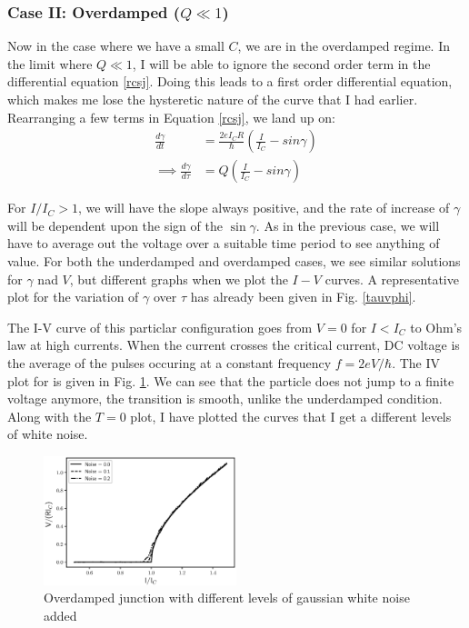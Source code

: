 \documentclass{thesis}
\begin{document}
\subsubsection{Case II: Overdamped ($Q\ll 1$)}

Now in the case where we have a small $C$, we are in the overdamped regime. In the limit where $Q \ll 1$, I will be able to ignore the second order term in the differential equation \ref{rcsj}. Doing this leads to a first order differential equation, which makes me lose the hysteretic nature of the curve that I had earlier. Rearranging a few terms in Equation \ref{rcsj}, we land up on:
\begin{align}
    \frac{d\gamma}{dt} &= \frac{2eI_C R}{\hbar} \left( \frac{I}{I_C} - sin \gamma \right)\\
    \implies \frac{d\gamma}{d \tau} &= Q \left( \frac{I}{I_C} - sin \gamma \right)
\end{align}

For $I/I_C > 1$, we will have the slope always positive, and the rate of increase of $\gamma$ will be dependent upon the sign of the $\sin \gamma$. As in the previous case, we will have to average out the voltage over a suitable time period to see anything of value. For both the underdamped and overdamped cases, we see similar solutions for $\gamma$ nad $V$, but different graphs when we plot the $I-V$ curves. A representative plot for the variation of $\gamma$ over $\tau$ has already been given in Fig. \ref{tauvphi}.

The I-V curve of this particlar configuration goes from $V=0$ for $I<I_C$ to Ohm's law at high currents. When the current crosses the critical current, DC voltage is the average of the pulses occuring at a constant frequency $f = 2eV/\hbar$. The IV plot for is given in Fig. \ref{noisyover}. We can see that the particle does not jump to a finite voltage anymore, the transition is smooth, unlike the underdamped condition. Along with the $T=0$ plot, I have plotted the curves that I get a different levels of white noise.

\begin{figure}[H]
    \centering
    \includegraphics[width=0.5\textwidth]{images/Q_0.001.eps}
    \caption{Overdamped junction with different levels of gaussian white noise added}
    \label{noisyover}
\end{figure}
\end{document}
